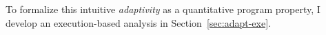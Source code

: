 \begin{enumerate}
To formalize this intuitive \emph{adaptivity} as a quantitative program property, 
I develop an execution-based analysis in Section~\ref{sec:adapt-exe}.

\end{enumerate}
